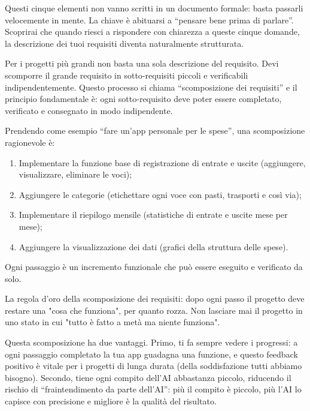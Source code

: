 Questi cinque elementi non vanno scritti in un documento formale: basta passarli velocemente in mente. La chiave è abituarsi a “pensare bene prima di parlare”. Scoprirai che quando riesci a rispondere con chiarezza a queste cinque domande, la descrizione dei tuoi requisiti diventa naturalmente strutturata.


Per i progetti più grandi non basta una sola descrizione del requisito. Devi scomporre il grande requisito in sotto-requisiti piccoli e verificabili indipendentemente. Questo processo si chiama “scomposizione dei requisiti” e il principio fondamentale è: ogni sotto-requisito deve poter essere completato, verificato e consegnato in modo indipendente.

Prendendo come esempio “fare un'app personale per le spese”, una scomposizione ragionevole è:

\begin{enumerate}
  \item Implementare la funzione base di registrazione di entrate e uscite (aggiungere, visualizzare, eliminare le voci);
  \item Aggiungere le categorie (etichettare ogni voce con pasti, trasporti e così via);
  \item Implementare il riepilogo mensile (statistiche di entrate e uscite mese per mese);
  \item Aggiungere la visualizzazione dei dati (grafici della struttura delle spese).
\end{enumerate}

Ogni passaggio è un incremento funzionale che può essere eseguito e verificato da solo.

La regola d'oro della scomposizione dei requisiti: dopo ogni passo il progetto deve restare una "cosa che funziona", per quanto rozza. Non lasciare mai il progetto in uno stato in cui "tutto è fatto a metà ma niente funziona".

Questa scomposizione ha due vantaggi. Primo, ti fa sempre vedere i progressi: a ogni passaggio completato la tua app guadagna una funzione, e questo feedback positivo è vitale per i progetti di lunga durata (della soddisfazione tutti abbiamo bisogno). Secondo, tiene ogni compito dell'AI abbastanza piccolo, riducendo il rischio di “fraintendimento da parte dell'AI”: più il compito è piccolo, più l'AI lo capisce con precisione e migliore è la qualità del risultato.


